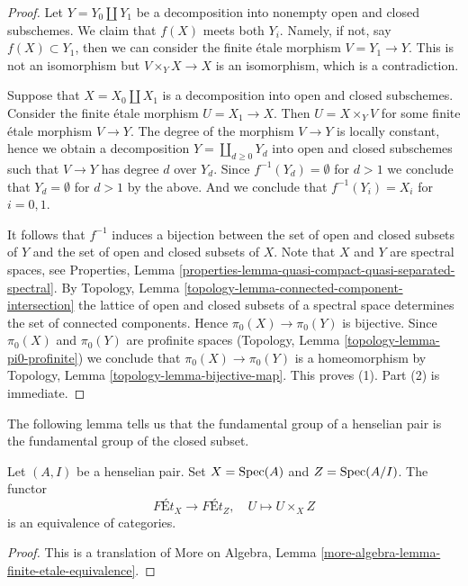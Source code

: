 \begin{proof}
Let $Y = Y_0 \amalg Y_1$ be a decomposition into nonempty open and closed
subschemes. We claim that $f(X)$ meets both $Y_i$. Namely, if not,
say $f(X) \subset Y_1$, then we can consider the finite \'etale
morphism $V = Y_1 \to Y$. This is not an
isomorphism but $V \times_Y X \to X$ is an isomorphism, which is
a contradiction.

\medskip\noindent
Suppose that $X = X_0 \amalg X_1$ is a decomposition into open and closed
subschemes. Consider the finite \'etale morphism $U = X_1 \to X$. Then
$U = X \times_Y V$ for some finite \'etale morphism $V \to Y$. The degree
of the morphism $V \to Y$ is locally constant, hence we obtain a decomposition
$Y = \coprod_{d \geq 0} Y_d$ into open and closed subschemes
such that $V \to Y$ has degree $d$ over $Y_d$. Since
$f^{-1}(Y_d) = \emptyset$ for $d > 1$ we conclude that $Y_d = \emptyset$
for $d > 1$ by the above. And we conclude that $f^{-1}(Y_i) = X_i$
for $i = 0, 1$.

\medskip\noindent
It follows that $f^{-1}$ induces a bijection between the set of
open and closed subsets of $Y$ and the set of open and closed subsets of $X$.
Note that $X$ and $Y$ are spectral spaces, see Properties, Lemma
\ref{properties-lemma-quasi-compact-quasi-separated-spectral}.
By Topology, Lemma \ref{topology-lemma-connected-component-intersection}
the lattice of open and closed subsets of a spectral space
determines the set of connected components.
Hence $\pi_0(X) \to \pi_0(Y)$ is bijective. Since $\pi_0(X)$ and
$\pi_0(Y)$ are profinite spaces
(Topology, Lemma \ref{topology-lemma-pi0-profinite})
we conclude that $\pi_0(X) \to \pi_0(Y)$ is a homeomorphism by
Topology, Lemma \ref{topology-lemma-bijective-map}. This proves (1).
Part (2) is immediate.
\end{proof}

\noindent
The following lemma tells us that the fundamental group of a henselian
pair is the fundamental group of the closed subset.

\begin{lemma}
\label{lemma-gabber}
Let $(A, I)$ be a henselian pair. Set $X = \mathop{\mathrm{Spec}}(A)$ and $Z = \mathop{\mathrm{Spec}}(A/I)$.
The functor
$$
\textit{F\'Et}_X \longrightarrow \textit{F\'Et}_Z,\quad
U \longmapsto U \times_X Z
$$
is an equivalence of categories.
\end{lemma}

\begin{proof}
This is a translation of
More on Algebra, Lemma \ref{more-algebra-lemma-finite-etale-equivalence}.
\end{proof}

